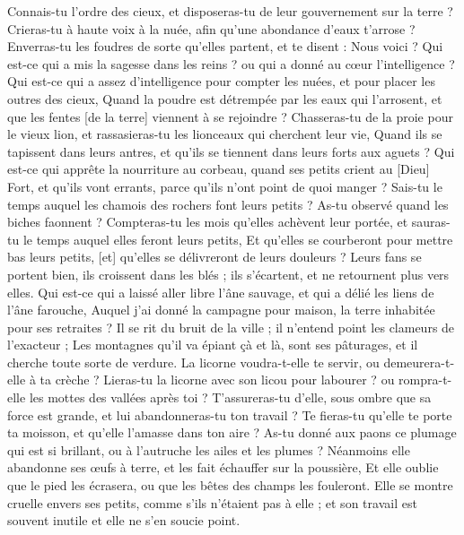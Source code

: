 \begin{multicols}{2}
Connais-tu l'ordre des cieux, et disposeras-tu de leur gouvernement sur la terre ?
Crieras-tu à haute voix à la nuée, afin qu'une abondance d'eaux t'arrose ?
Enverras-tu les foudres de sorte qu'elles partent, et te disent : Nous voici ?
Qui est-ce qui a mis la sagesse dans les reins ? ou qui a donné au cœur l'intelligence ?
Qui est-ce qui a assez d'intelligence pour compter les nuées, et pour placer les outres des cieux,
Quand la poudre est détrempée par les eaux qui l'arrosent, et que les fentes [de la terre] viennent à se rejoindre ?
\VerseOne{}Chasseras-tu de la proie pour le vieux lion, et rassasieras-tu les lionceaux qui cherchent leur vie,
Quand ils se tapissent dans leurs antres, et qu'ils se tiennent dans leurs forts aux aguets ?
Qui est-ce qui apprête la nourriture au corbeau, quand ses petits crient au [Dieu] Fort, et qu'ils vont errants, parce qu'ils n'ont point de quoi manger ?
Sais-tu le temps auquel les chamois des rochers font leurs petits ? As-tu observé quand les biches faonnent ?
Compteras-tu les mois qu'elles achèvent leur portée, et sauras-tu le temps auquel elles feront leurs petits,
Et qu'elles se courberont pour mettre bas leurs petits, [et] qu'elles se délivreront de leurs douleurs ?
Leurs fans se portent bien, ils croissent dans les blés ; ils s'écartent, et ne retournent plus vers elles.
Qui est-ce qui a laissé aller libre l'âne sauvage, et qui a délié les liens de l'âne farouche,
Auquel j'ai donné la campagne pour maison, la terre inhabitée pour ses retraites ?
Il se rit du bruit de la ville ; il n'entend point les clameurs de l'exacteur ;
Les montagnes qu'il va épiant çà et là, sont ses pâturages, et il cherche toute sorte de verdure.
La licorne voudra-t-elle te servir, ou demeurera-t-elle à ta crèche ?
Lieras-tu la licorne avec son licou pour labourer ? ou rompra-t-elle les mottes des vallées après toi ?
T'assureras-tu d'elle, sous ombre que sa force est grande, et lui abandonneras-tu ton travail ?
Te fieras-tu qu'elle te porte ta moisson, et qu'elle l'amasse dans ton aire ?
As-tu donné aux paons ce plumage qui est si brillant, ou à l'autruche les ailes et les plumes ?
Néanmoins elle abandonne ses œufs à terre, et les fait échauffer sur la poussière,
Et elle oublie que le pied les écrasera, ou que les bêtes des champs les fouleront.
Elle se montre cruelle envers ses petits, comme s'ils n'étaient pas à elle ; et son travail est souvent inutile et elle ne s'en soucie point.

\end{multicols}
